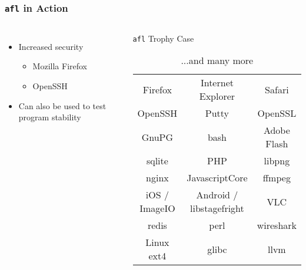 \begin{frame}
\frametitle{\texttt{afl} in Action}

\begin{columns}


\begin{itemize}
\item{Increased security}
\begin{itemize}
\item{Mozilla Firefox}
\item{OpenSSH}
\end{itemize}
\item{Can also be used to test program stability}
\end{itemize}


\begin{center}
\begin{table}
\caption{\texttt{afl} Trophy Case}
\tiny
\begin{tabular}{c | c | c}
Firefox & Internet Explorer & Safari \\
OpenSSH & Putty & OpenSSL \\
GnuPG & bash & Adobe Flash \\
sqlite & PHP & libpng \\
nginx & JavascriptCore & ffmpeg \\
iOS / ImageIO & Android / libstagefright & VLC \\
redis & perl & wireshark \\
Linux ext4 & glibc & llvm \\
\end{tabular}
\caption*{...and many more}
\end{table}
\end{center}

\end{columns}
\end{frame}
